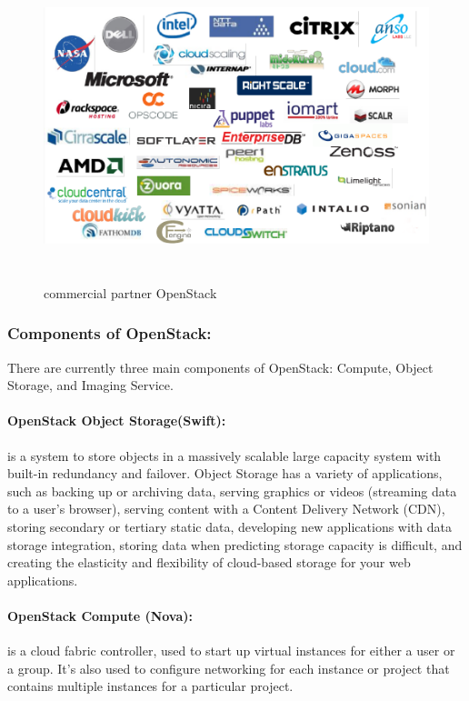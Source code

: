 \begin{figure}[!h]
 \center
 \includegraphics[width=12cm, height=9cm]{./images/part.png}
 \caption{commercial partner OpenStack}
\end{figure}

 



\subsubsection{Components of OpenStack:}
There are currently three main components of OpenStack: Compute, Object Storage, and Imaging Service.

\paragraph{OpenStack Object Storage(Swift):}is a system to store objects in a massively scalable large capacity system with built-in redundancy and failover.
 Object Storage has a variety of applications, such as backing up or archiving data, serving graphics or videos (streaming data to a user’s browser), 
serving content with a Content Delivery Network (CDN), storing secondary or tertiary static data, developing new applications with data storage integration, 
storing data when predicting storage capacity is difficult, and creating the elasticity and flexibility of cloud-based storage for your web applications.

\paragraph{OpenStack Compute (Nova):}is a cloud fabric controller, used to start up virtual instances for either a user or a group. 
It's also used to configure networking for each instance or project that contains multiple instances for a particular project.
 
